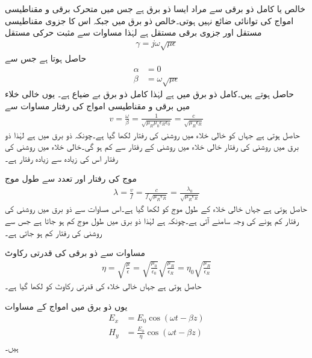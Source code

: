 خالص یا کامل ذو برقی سے مراد ایسا ذو برق ہے جس میں متحرک برقی و مقناطیسی امواج کی توانائی ضائع نہیں ہوتی۔خالص ذو برق میں  جبکہ اس کا جزوی مقناطیسی مستقل  اور جزوی برقی مستقل   ہے لہٰذا مساوات  سے مثبت حرکی مستقل
\begin{align*}
\gamma=j \omega \sqrt{\mu \epsilon }
\end{align*}
حاصل ہوتا ہے جس سے
\begin{align}
\alpha&=0\\
\beta&=\omega \sqrt{\mu \epsilon} \label{مساوات_موج_کامل-ذوبرق_بیٹا}
\end{align}
حاصل ہوتے ہیں۔کامل ذو برق میں  ہے لہٰذا کامل ذو برق بے ضیاع ہے۔ یوں خالی خلاء میں برقی و مقناطیسی امواج کی رفتار  مساوات  سے
\begin{align}
v=\frac{\omega}{\beta}=\frac{1}{\sqrt{\mu_R \mu_0 \epsilon_R \epsilon_0}}=\frac{c}{\sqrt{\mu_R \epsilon_R}}
\end{align} 
حاصل ہوتی ہے جہاں  کو خالی خلاء میں روشنی کی رفتار  لکھا گیا ہے۔چونکہ ذو برق میں  ہے  لہٰذا ذو برق میں روشنی کی رفتار خالی خلاء میں روشنی کے رفتار سے کم ہو گی۔خالی خلاء میں روشنی کی رفتار اس کی زیادہ سے زیادہ رفتار ہے۔

موج کی رفتار اور تعدد سے طول موج
\begin{align}
\lambda=\frac{v}{f}=\frac{c}{f \sqrt{\mu_R \epsilon_R}}=\frac{\lambda_0}{\sqrt{\mu_R \epsilon_R}}
\end{align}
حاصل ہوتی ہے جہاں خالی خلاء کے طول موج کو  لکھا گیا ہے۔اس مساوات سے ذو برق میں روشنی کی رفتار کم ہونے کی وجہ سامنے آتی ہے۔چونکہ  ہے لہٰذا ذو برق میں طول موج کم ہو جاتا ہے جس سے روشنی کی رفتار کم ہو جاتی ہے۔


مساوات  سے ذو برقی کی  قدرتی رکاوٹ
\begin{align*}
\eta =\sqrt{\frac{\mu}{\epsilon}}=\sqrt{\frac{\mu_0}{\epsilon_0}}\sqrt{\frac{\mu_R}{\epsilon_R}}= \eta_0 \sqrt{\frac{\mu_R}{\epsilon_R}}
\end{align*}
حاصل ہوتی ہے جہاں خالی خلاء کی قدرتی رکاوٹ کو  لکھا گیا ہے۔

یوں ذو برق میں امواج کے مساوات
\begin{align}
E_x&=E_0 \cos (\omega t -\beta z)\\
H_y&=\frac{E_0}{\eta} \cos (\omega t -\beta z)
\end{align}
ہیں۔

